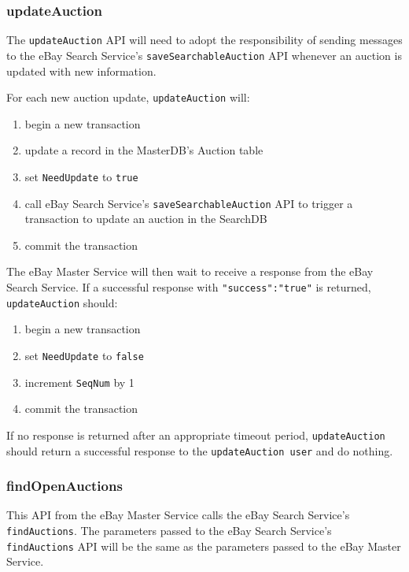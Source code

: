 \documentclass[12pt,a4paper]{article}
\begin{document}
\pagebreak
\subsubsection{updateAuction}

The \texttt{updateAuction} API will need to adopt the responsibility of sending messages to the eBay Search Service's
\texttt{saveSearchableAuction} API whenever an auction is updated with new information.

For each new auction update, \texttt{updateAuction} will:

\begin{enumerate}
    \item begin a new transaction
    \item update a record in the MasterDB's Auction table
    \item set \texttt{NeedUpdate} to \texttt{true}
    \item call eBay Search Service's \texttt{saveSearchableAuction} API to trigger a transaction to update an auction in the SearchDB
    \item commit the transaction
\end{enumerate}


The eBay Master Service will then wait to receive a response from the eBay Search Service. 
If a successful response with \texttt{"success":"true"} is returned, 
 \texttt{updateAuction} should:
 
 \begin{enumerate}
     \item begin a new transaction
     \item set \texttt{NeedUpdate} to \texttt{false}
     \item increment \texttt{SeqNum} by 1
     \item commit the transaction
 \end{enumerate}


 If no response is returned after an appropriate timeout period, \texttt{updateAuction} 
 should return a successful response to the \texttt{updateAuction user} and do nothing.

 
\subsubsection{findOpenAuctions}
This API from the eBay Master Service calls the eBay Search Service's \texttt{findAuctions}.
The parameters passed to the eBay Search Service's \texttt{findAuctions} API will be the same
as the parameters passed to the eBay Master Service.
\vspace{\baselineskip}
\end{document}
